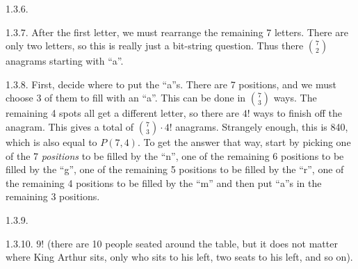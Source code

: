 \begin {itemize}
\begin{ans}{1.3.6.}
\end{ans}
\begin{ans}{1.3.7.}
	 After the first letter, we must rearrange the remaining 7 letters.  There are only two letters, so this is really just a bit-string question.  Thus there ${7 \choose 2}$ anagrams starting with ``a''.
	
\end{ans}
\begin{ans}{1.3.8.}
		First, decide where to put the ``a''s.  There are 7 positions, and we must choose 3 of them to fill with an ``a''.  This can be done in ${7 \choose 3}$ ways.  The remaining 4 spots all get a different letter, so there are $4!$ ways to finish off the anagram.  This gives a total of ${7 \choose 3}\cdot 4!$ anagrams.  Strangely enough, this is 840, which is also equal to $P(7,4)$.  To get the answer that way, start by picking one of the 7 \emph{positions} to be filled by the ``n'', one of the remaining 6 positions to be filled by the ``g'', one of the remaining 5 positions to be filled by the ``r'', one of the remaining 4 positions to be filled by the ``m'' and then put ``a''s in the remaining 3 positions.
	
\end{ans}
\begin{ans}{1.3.9.}
  
\end{ans}
\begin{ans}{1.3.10.}
     $9!$ (there are 10 people seated around the table, but it does not matter where King Arthur sits, only who sits to his left, two seats to his left, and so on).
  
\end{ans}
\protect \end {itemize}
